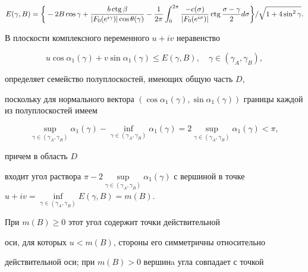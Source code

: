 {\begin{gather*}
%


E(\gamma,B)=\bigg\lbrace-2B\cos\gamma +


\frac{b\ctg \beta}{|F_{0}(e^{i\gamma})|


\cos\theta(\gamma)} -


\frac{1}{2\pi}


\int_{0}^{2\pi}\frac{-c(\sigma)}{|F_{0}(e^{i\sigma})|}


\ctg\frac{\sigma -\gamma}{2}d\sigma\bigg\rbrace/\sqrt{1+


4\sin^{2}\gamma}.


\end{gather*}





В плоскости комплексного переменного $u+iv$ неравенство


$$


u\cos\alpha_{1}(\gamma)+v\sin\alpha_{1}(\gamma)\leq E(\gamma,B),


\quad\gamma\in(\gamma_{A},\gamma_{B}),


$$


определяет семейство полуплоскостей, имеющих общую часть $D$,


поскольку для нормального вектора $(\cos\alpha_{1}(\gamma),


\sin\alpha_{1}(\gamma))$ границы каждой из полуплоскостей имеем


$$


\sup\limits_{\gamma\in(\gamma_{A},\gamma_{B})}\alpha_{1}(\gamma)-


\inf\limits_{\gamma\in(\gamma_{A},\gamma_{B})}\alpha_{1}(\gamma)=


2\sup\limits_{\gamma\in(\gamma_{A},\gamma_{B})}\alpha_{1}(\gamma)


<\pi,


$$


причем в область $D$


входит угол раствора $\pi -2\sup\limits_{\gamma\in(\gamma_{A},


\gamma_{B})}\alpha_{1}(\gamma)$ с вершиной в точке $u+iv=


\inf\limits_{\gamma\in(\gamma_{A},\gamma_{B})}E(\gamma,B)=m(B)$.


При $m(B)\geq 0$ этот угол содержит точки действительной


оси, для которых $u< m(B)$, стороны его симметричны относительно


действительной оси; при $m(B) > 0$ вершинa угла совпадает с точкой


}

